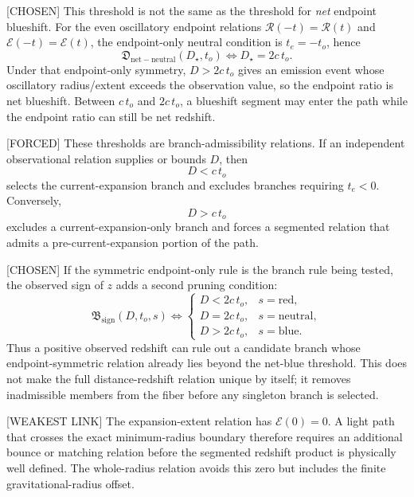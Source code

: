 \documentclass[11pt]{article}
\newcommand{\RG}{\mathcal{R}}
\newcommand{\EG}{\mathcal{E}}
\begin{document}
[CHOSEN] This threshold is not the same as the threshold for \emph{net}
endpoint blueshift.  For the even oscillatory endpoint relations
\(\RG(-t)=\RG(t)\) and \(\EG(-t)=\EG(t)\), the endpoint-only neutral condition
is \(t_e=-t_o\), hence
\begin{equation}
\mathfrak{D}_{\mathrm{net-neutral}}(D_\star,t_o)
\Longleftrightarrow
D_\star=2c\,t_o.
\label{eq:net-blue-threshold}
\end{equation}
Under that endpoint-only symmetry, \(D>2c\,t_o\) gives an emission event whose
oscillatory radius/extent exceeds the observation value, so the endpoint ratio
is net blueshift.  Between \(c\,t_o\) and \(2c\,t_o\), a blueshift segment may
enter the path while the endpoint ratio can still be net redshift.

[FORCED] These thresholds are branch-admissibility relations.  If an
independent observational relation supplies or bounds \(D\), then
\[
D<c\,t_o
\]
selects the current-expansion branch and excludes branches requiring
\(t_e<0\).  Conversely,
\[
D>c\,t_o
\]
excludes a current-expansion-only branch and forces a segmented relation that
admits a pre-current-expansion portion of the path.

[CHOSEN] If the symmetric endpoint-only rule is the branch rule being tested,
the observed sign of \(z\) adds a second pruning condition:
\begin{equation}
\mathfrak{B}_{\mathrm{sign}}(D,t_o,s)
\Longleftrightarrow
\begin{cases}
D<2c\,t_o, & s=\mathrm{red},\\
D=2c\,t_o, & s=\mathrm{neutral},\\
D>2c\,t_o, & s=\mathrm{blue}.
\end{cases}
\label{eq:blue-sign-branch-admissibility}
\end{equation}
Thus a positive observed redshift can rule out a candidate branch whose
endpoint-symmetric relation already lies beyond the net-blue threshold.  This
does not make the full distance-redshift relation unique by itself; it removes
inadmissible members from the fiber before any singleton branch is selected.

[WEAKEST LINK] The expansion-extent relation has \(\EG(0)=0\).  A light path
that crosses the exact minimum-radius boundary therefore requires an additional
bounce or matching relation before the segmented redshift product is physically
well defined.  The whole-radius relation avoids this zero but includes the
finite gravitational-radius offset.
\end{document}
